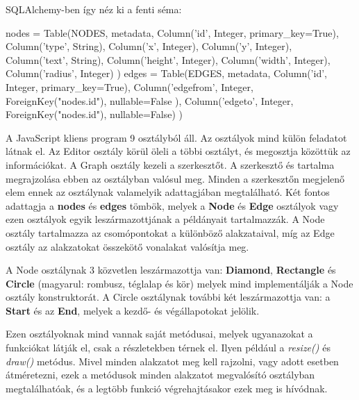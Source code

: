 SQLAlchemy-ben így néz ki a fenti séma:

\begin{python}
            nodes = Table(NODES, metadata,
                        Column('id', Integer, primary_key=True),
                        Column('type', String),
                        Column('x', Integer),
                        Column('y', Integer),
                        Column('text', String),
                        Column('height', Integer),
                        Column('width', Integer),
                        Column('radius', Integer)
                        )
            edges = Table(EDGES, metadata,
                        Column('id', Integer, primary_key=True),
                        Column('edgefrom', Integer, 
ForeignKey("nodes.id"), nullable=False ),
                        Column('edgeto', Integer, 
ForeignKey("nodes.id"), nullable=False)
                        ) 
\end{python}

\newpage

A JavaScript kliens program 9 osztályból áll. Az osztályok mind külön feladatot látnak el. Az Editor osztály körül öleli a többi osztályt, és megosztja közöttük az információkat. A Graph osztály kezeli a szerkesztőt. A szerkesztő és tartalma megrajzolása ebben az osztályban valósul meg. Minden a szerkesztőn megjelenő elem ennek az osztálynak valamelyik adattagjában megtalálható. Két fontos adattagja a \textbf{nodes} és \textbf{edges} tömbök, melyek a \textbf{Node} és \textbf{Edge} osztályok vagy ezen osztályok egyik leszármazottjának a példányait tartalmazzák. A Node osztály tartalmazza az csomópontokat a különböző alakzataival, míg az Edge osztály az alakzatokat összekötő vonalakat valósítja meg.
 
A Node osztálynak 3 közvetlen leszármazottja van: \textbf{Diamond}, \textbf{Rectangle} és \textbf{Circle} (magyarul: rombusz, téglalap és kör) melyek mind implementálják a Node osztály konstruktorát. A Circle osztálynak további két leszármazottja van: a \textbf{Start} és az \textbf{End}, melyek a kezdő- és végállapotokat jelölik.

Ezen osztályoknak mind vannak saját metódusai, melyek ugyanazokat a funkciókat látják el, csak a részletekben térnek el. Ilyen például a \textit{resize()} és \textit{draw()} metódus. Mivel minden alakzatot meg kell rajzolni, vagy adott esetben átméretezni, ezek a metódusok minden alakzatot megvalósító osztályban megtalálhatóak, és a legtöbb funkció végrehajtásakor ezek meg is hívódnak.
 

